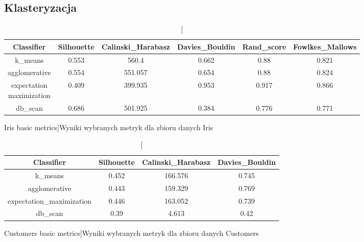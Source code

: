 \documentclass{classrep}
\begin{document}
{        \subsection{Klasteryzacja}
        \label{results:clustering} {
            \begin{table}[!htbp]
            \begin{adjustbox}{minipage=20cm, center}
            \centering
            \begin{tabular}{|c|c|c|c|c|c|}
            \hline
            Classifier & Silhouette & Calinski\_Harabasz & Davies\_Bouldin & Rand\_score & Fowlkes\_Mallows \\ \hline
            k\_means & 0.553 & 560.4 & 0.662 & 0.88 & 0.821 \\ \hline
            agglomerative & 0.554 & 551.057 & 0.654 & 0.88 & 0.824 \\ \hline
            \makecell{ expectation\\maximization} & 0.409 & 399.935 & 0.953 & 0.917 & 0.866 \\ \hline
            db\_scan & 0.686 & 501.925 & 0.384 & 0.776 & 0.771 \\ \hline
            \end{tabular}
            \caption
            [Iris basic metrics]{Wyniki wybranych metryk dla zbioru danych Iris}
            \label{Iris_basic_metrics}
            \end{adjustbox}
            \end{table}
            \FloatBarrier
    
            \begin{table}[!htbp]
            \centering
            \begin{tabular}{|c|c|c|c|}
            \hline
            Classifier & Silhouette & Calinski\_Harabasz & Davies\_Bouldin \\ \hline
            k\_means & 0.452 & 166.576 & 0.745 \\ \hline
            agglomerative & 0.443 & 159.329 & 0.769 \\ \hline
            expectation\_maximization & 0.446 & 163.052 & 0.739 \\ \hline
            db\_scan & 0.39 & 4.613 & 0.42 \\ \hline
            \end{tabular}
            \caption
            [Customers basic metrics]{Wyniki wybranych metryk dla zbioru danych Customers}
            \label{Customers_basic_metrics}
            \end{table}
            \FloatBarrier
            
}}
\end{document}

